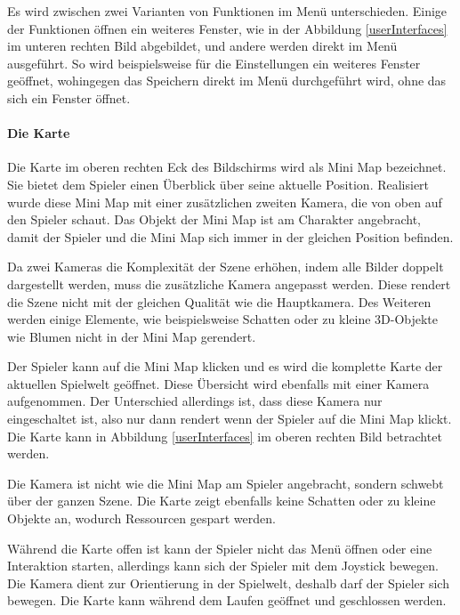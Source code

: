					Es wird zwischen zwei Varianten von Funktionen im Menü unterschieden. Einige der Funktionen öffnen ein weiteres Fenster, wie in der Abbildung \ref{userInterfaces} im unteren rechten Bild abgebildet, und andere werden direkt im Menü ausgeführt. So wird beispielsweise für die Einstellungen ein weiteres Fenster geöffnet, wohingegen das Speichern direkt im Menü durchgeführt wird, ohne das sich ein Fenster öffnet.

				\paragraph{Die Karte}
					Die Karte im oberen rechten Eck des Bildschirms wird als Mini Map bezeichnet. Sie bietet dem Spieler einen Überblick über seine aktuelle Position. Realisiert wurde diese Mini Map mit einer zusätzlichen zweiten Kamera, die von oben auf den Spieler schaut. Das Objekt der Mini Map ist am Charakter angebracht, damit der Spieler und die Mini Map sich immer in der gleichen Position befinden.

					Da zwei Kameras die Komplexität der Szene erhöhen, indem alle Bilder doppelt dargestellt werden, muss die zusätzliche Kamera angepasst werden. Diese rendert die Szene nicht mit der gleichen Qualität wie die Hauptkamera. Des Weiteren werden einige Elemente, wie beispielsweise Schatten oder zu kleine 3D-Objekte wie Blumen nicht in der Mini Map gerendert. 

					Der Spieler kann auf die Mini Map klicken und es wird die komplette Karte der aktuellen Spielwelt geöffnet. Diese Übersicht wird ebenfalls mit einer Kamera aufgenommen. Der Unterschied allerdings ist, dass diese Kamera nur eingeschaltet ist, also nur dann rendert wenn der Spieler auf die Mini Map klickt. Die Karte kann in Abbildung \ref{userInterfaces} im oberen rechten Bild betrachtet werden.

					Die Kamera ist nicht wie die Mini Map am Spieler angebracht, sondern schwebt über der ganzen Szene. Die Karte zeigt ebenfalls keine Schatten oder zu kleine Objekte an, wodurch Ressourcen gespart werden.

					Während die Karte offen ist kann der Spieler nicht das Menü öffnen oder eine Interaktion starten, allerdings kann sich der Spieler mit dem Joystick bewegen. Die Kamera dient zur Orientierung in der Spielwelt, deshalb darf der Spieler sich bewegen. Die Karte kann während dem Laufen geöffnet und geschlossen werden.

